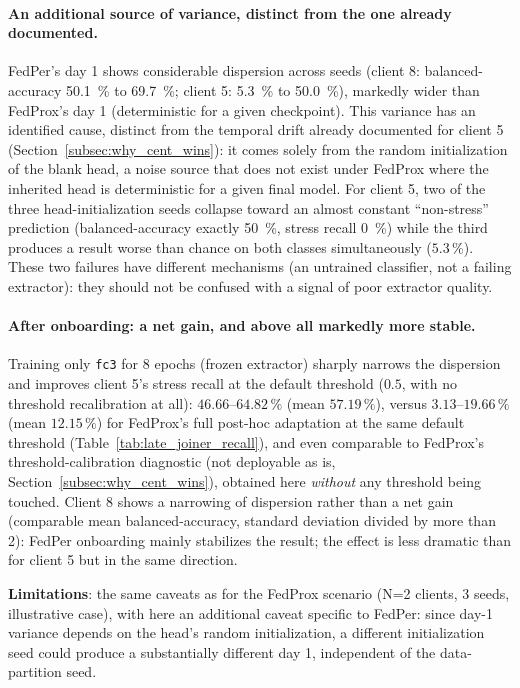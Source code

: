 \documentclass{article}
\begin{document}
\paragraph{An additional source of variance, distinct from the one already
documented.} FedPer's day 1 shows considerable dispersion across seeds (client 8:
balanced-accuracy 50.1~\% to 69.7~\%; client 5: 5.3~\% to 50.0~\%), markedly wider
than FedProx's day 1 (deterministic for a given checkpoint). This variance has an
identified cause, distinct from the temporal drift already documented for client
5 (Section~\ref{subsec:why_cent_wins}): it comes solely from the random
initialization of the blank head, a noise source that does not exist under
FedProx where the inherited head is deterministic for a given final model. For
client 5, two of the three head-initialization seeds collapse toward an almost
constant ``non-stress'' prediction (balanced-accuracy exactly 50~\%, stress
recall 0~\%) while the third produces a result worse than chance on both classes
simultaneously ($5.3\,\%$). These two failures have different mechanisms (an
untrained classifier, not a failing extractor): they should not be confused with
a signal of poor extractor quality.

\paragraph{After onboarding: a net gain, and above all markedly more stable.}
Training only \texttt{fc3} for 8 epochs (frozen extractor) sharply narrows the
dispersion and improves client 5's stress recall at the default threshold
($0.5$, with no threshold recalibration at all): $46.66$--$64.82\,\%$ (mean
$57.19\,\%$), versus $3.13$--$19.66\,\%$ (mean $12.15\,\%$) for FedProx's full
post-hoc adaptation at the same default threshold
(Table~\ref{tab:late_joiner_recall}), and even comparable to FedProx's
threshold-calibration diagnostic (not deployable as is,
Section~\ref{subsec:why_cent_wins}), obtained here \emph{without} any threshold
being touched. Client 8 shows a narrowing of dispersion rather than a net gain
(comparable mean balanced-accuracy, standard deviation divided by more than 2):
FedPer onboarding mainly stabilizes the result; the effect is less dramatic than
for client 5 but in the same direction.

\textbf{Limitations}: the same caveats as for the FedProx scenario (N=2 clients,
3 seeds, illustrative case), with here an additional caveat specific to FedPer:
since day-1 variance depends on the head's random initialization, a different
initialization seed could produce a substantially different day 1, independent of
the data-partition seed.
\end{document}
